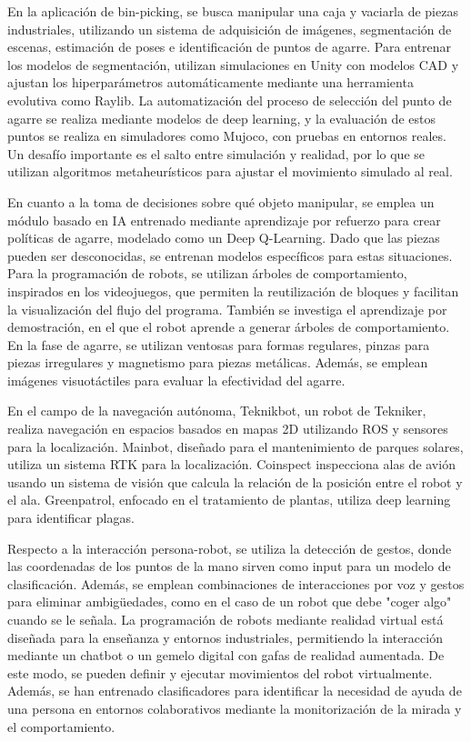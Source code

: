 En la aplicación de bin-picking, se busca manipular una caja y vaciarla de piezas industriales, utilizando un sistema de adquisición de imágenes, segmentación de escenas, estimación de poses e identificación de puntos de agarre. Para entrenar los modelos de segmentación, utilizan simulaciones en Unity con modelos CAD y ajustan los hiperparámetros automáticamente mediante una herramienta evolutiva como Raylib. La automatización del proceso de selección del punto de agarre se realiza mediante modelos de deep learning, y la evaluación de estos puntos se realiza en simuladores como Mujoco, con pruebas en entornos reales. Un desafío importante es el salto entre simulación y realidad, por lo que se utilizan algoritmos metaheurísticos para ajustar el movimiento simulado al real. 

En cuanto a la toma de decisiones sobre qué objeto manipular, se emplea un módulo basado en IA entrenado mediante aprendizaje por refuerzo para crear políticas de agarre, modelado como un Deep Q-Learning. Dado que las piezas pueden ser desconocidas, se entrenan modelos específicos para estas situaciones. Para la programación de robots, se utilizan árboles de comportamiento, inspirados en los videojuegos, que permiten la reutilización de bloques y facilitan la visualización del flujo del programa. También se investiga el aprendizaje por demostración, en el que el robot aprende a generar árboles de comportamiento. En la fase de agarre, se utilizan ventosas para formas regulares, pinzas para piezas irregulares y magnetismo para piezas metálicas. Además, se emplean imágenes visuotáctiles para evaluar la efectividad del agarre.

En el campo de la navegación autónoma, Teknikbot, un robot de Tekniker, realiza navegación en espacios basados en mapas 2D utilizando ROS y sensores para la localización. Mainbot, diseñado para el mantenimiento de parques solares, utiliza un sistema RTK para la localización. Coinspect inspecciona alas de avión usando un sistema de visión que calcula la relación de la posición entre el robot y el ala. Greenpatrol, enfocado en el tratamiento de plantas, utiliza deep learning para identificar plagas.

Respecto a la interacción persona-robot, se utiliza la detección de gestos, donde las coordenadas de los puntos de la mano sirven como input para un modelo de clasificación. Además, se emplean combinaciones de interacciones por voz y gestos para eliminar ambigüedades, como en el caso de un robot que debe "coger algo" cuando se le señala. La programación de robots mediante realidad virtual está diseñada para la enseñanza y entornos industriales, permitiendo la interacción mediante un chatbot o un gemelo digital con gafas de realidad aumentada. De este modo, se pueden definir y ejecutar movimientos del robot virtualmente. Además, se han entrenado clasificadores para identificar la necesidad de ayuda de una persona en entornos colaborativos mediante la monitorización de la mirada y el comportamiento.

